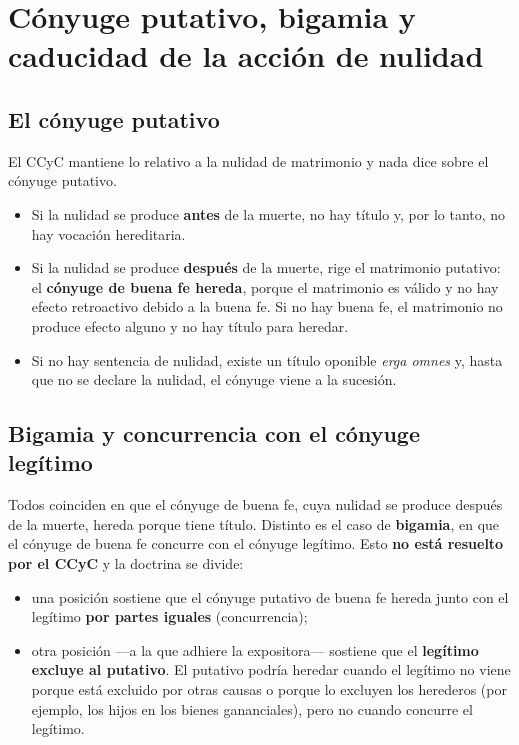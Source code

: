 \documentclass[12pt,oneside]{book}
\begin{document}
\section{Cónyuge putativo, bigamia y caducidad de la acción de nulidad}

\subsection{El cónyuge putativo}

El CCyC mantiene lo relativo a la nulidad de matrimonio y nada dice sobre el cónyuge putativo.

\begin{itemize}
    \item Si la nulidad se produce \textbf{antes} de la muerte, no hay título y, por lo tanto, no hay vocación hereditaria.
    \item Si la nulidad se produce \textbf{después} de la muerte, rige el matrimonio putativo: el \textbf{cónyuge de buena fe hereda}, porque el matrimonio es válido y no hay efecto retroactivo debido a la buena fe. Si no hay buena fe, el matrimonio no produce efecto alguno y no hay título para heredar.
    \item Si no hay sentencia de nulidad, existe un título oponible \textit{erga omnes} y, hasta que no se declare la nulidad, el cónyuge viene a la sucesión.
\end{itemize}

\subsection{Bigamia y concurrencia con el cónyuge legítimo}

Todos coinciden en que el cónyuge de buena fe, cuya nulidad se produce después de la muerte, hereda porque tiene título. Distinto es el caso de \textbf{bigamia}, en que el cónyuge de buena fe concurre con el cónyuge legítimo. Esto \textbf{no está resuelto por el CCyC} y la doctrina se divide:

\begin{itemize}
    \item una posición sostiene que el cónyuge putativo de buena fe hereda junto con el legítimo \textbf{por partes iguales} (concurrencia);
    \item otra posición ---a la que adhiere la expositora--- sostiene que el \textbf{legítimo excluye al putativo}. El putativo podría heredar cuando el legítimo no viene porque está excluido por otras causas o porque lo excluyen los herederos (por ejemplo, los hijos en los bienes gananciales), pero no cuando concurre el legítimo.
\end{itemize}
\end{document}
